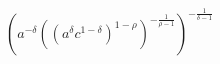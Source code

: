 $\displaystyle \left(a^{- \delta} \left(\left(a^{\delta} c^{1 - \delta}\right)^{1 - \rho}\right)^{- \frac{1}{\rho - 1}}\right)^{- \frac{1}{\delta - 1}}$
